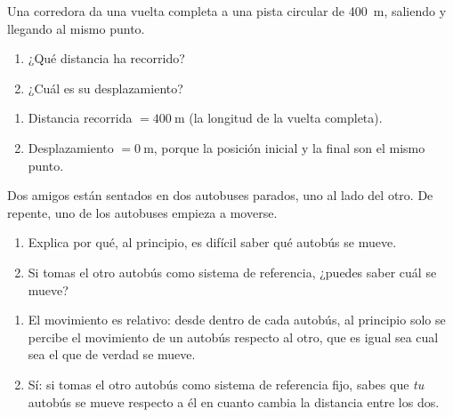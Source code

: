 \begin{exercise}
    Una corredora da una vuelta completa a una pista circular de \qty{400}{\m}, saliendo y llegando al mismo punto.
    \begin{enumerate}[label=\letraminuscula]
        \item ¿Qué distancia ha recorrido?
        \item ¿Cuál es su desplazamiento?
    \end{enumerate}
    \begin{solu}
        \begin{enumerate}[label=\alph*)]
            \item Distancia recorrida \(= \qty{400}{\m}\) (la longitud de la vuelta completa).
            \item Desplazamiento \(= \qty{0}{\m}\), porque la posición inicial y la final son el mismo punto.
        \end{enumerate}
    \end{solu}
\end{exercise}

\begin{exercise}
    Dos amigos están sentados en dos autobuses parados, uno al lado del otro. De repente, uno de los autobuses empieza a moverse.
    \begin{enumerate}[label=\letraminuscula]
        \item Explica por qué, al principio, es difícil saber qué autobús se mueve.
        \item Si tomas el otro autobús como sistema de referencia, ¿puedes saber cuál se mueve?
    \end{enumerate}
    \begin{solu}
        \begin{enumerate}[label=\alph*)]
            \item El movimiento es relativo: desde dentro de cada autobús, al principio solo se percibe el movimiento de un autobús respecto al otro, que es igual sea cual sea el que de verdad se mueve.
            \item Sí: si tomas el otro autobús como sistema de referencia fijo, sabes que \emph{tu} autobús se mueve respecto a él en cuanto cambia la distancia entre los dos.
        \end{enumerate}
    \end{solu}
\end{exercise}

